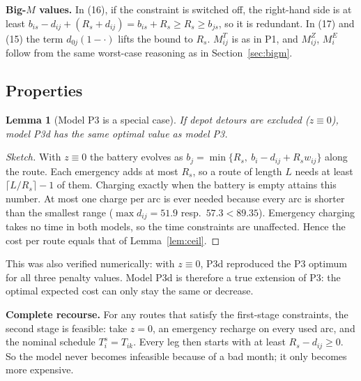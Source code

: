 \documentclass[11pt,a4paper]{article}
\newtheorem{lemma}{Lemma}
\theoremstyle{definition}
\begin{document}
\textbf{Big-$M$ values.} In (16), if the constraint is switched off, the right-hand side is at least $b_{is}-d_{ij}+(R_s+d_{ij})=b_{is}+R_s\ge R_s\ge b_{js}$, so it is redundant. In (17) and (15) the term $d_{0j}(1-\cdot)$ lifts the bound to $R_s$. $M^T_{ij}$ is as in P1, and $M^Z_{ij}$, $M^E_i$ follow from the same worst-case reasoning as in Section~\ref{sec:bigm}.

\subsection{Properties}
\begin{lemma}[Model P3 is a special case]\label{lem:nest}
If depot detours are excluded ($z\equiv0$), model P3d has the same optimal value as model P3.
\end{lemma}
\begin{proof}[Sketch]
With $z\equiv0$ the battery evolves as $b_j=\min\{R_s,\ b_i-d_{ij}+R_s w_{ij}\}$ along the route. Each emergency adds at most $R_s$, so a route of length $L$ needs at least $\lceil L/R_s\rceil-1$ of them. Charging exactly when the battery is empty attains this number. At most one charge per arc is ever needed because every arc is shorter than the smallest range ($\max d_{ij}=51.9$ resp.\ $57.3<89.35$). Emergency charging takes no time in both models, so the time constraints are unaffected. Hence the cost per route equals that of Lemma~\ref{lem:ceil}.
\end{proof}
This was also verified numerically: with $z\equiv0$, P3d reproduced the P3 optimum for all three penalty values. Model P3d is therefore a true extension of P3: the optimal expected cost can only stay the same or decrease.

\textbf{Complete recourse.} For any routes that satisfy the first-stage constraints, the second stage is feasible: take $z=0$, an emergency recharge on every used arc, and the nominal schedule $T^s_i=T_{ik}$. Every leg then starts with at least $R_s-d_{ij}\ge0$. So the model never becomes infeasible because of a bad month; it only becomes more expensive.
\end{document}
